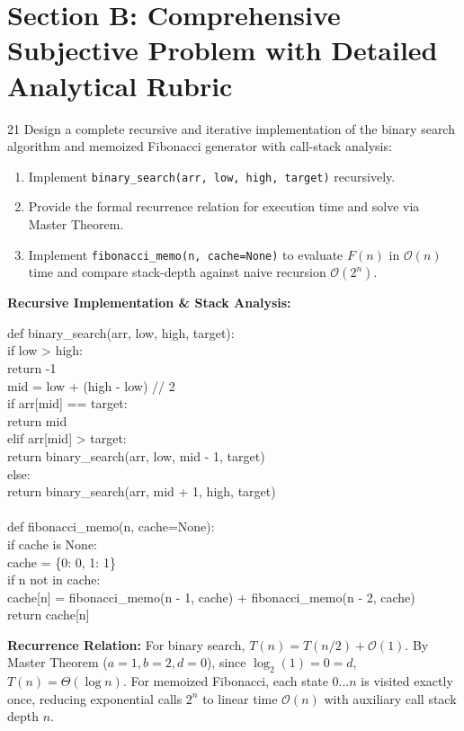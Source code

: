 \newpage
\section{Section B: Comprehensive Subjective Problem with Detailed Analytical Rubric}

\begin{subjectiveq}{2}{1}
Design a complete recursive and iterative implementation of the binary search algorithm and memoized Fibonacci generator with call-stack analysis:
\begin{enumerate}[label=(\alph*)]
    \item Implement \texttt{binary\_search(arr, low, high, target)} recursively.
    \item Provide the formal recurrence relation for execution time and solve via Master Theorem.
    \item Implement \texttt{fibonacci\_memo(n, cache=None)} to evaluate $F(n)$ in $\mathcal{O}(n)$ time and compare stack-depth against naive recursion $\mathcal{O}(2^n)$.
\end{enumerate}
\end{subjectiveq}

\begin{solbox}
\textbf{Recursive Implementation \& Stack Analysis:}
\begin{pycode}
def binary\_search(arr, low, high, target):\\
\quad if low > high:\\
\quad \quad return -1\\
\quad mid = low + (high - low) // 2\\
\quad if arr[mid] == target:\\
\quad \quad return mid\\
\quad elif arr[mid] > target:\\
\quad \quad return binary\_search(arr, low, mid - 1, target)\\
\quad else:\\
\quad \quad return binary\_search(arr, mid + 1, high, target)\\
~\\
def fibonacci\_memo(n, cache=None):\\
\quad if cache is None:\\
\quad \quad cache = \{0: 0, 1: 1\}\\
\quad if n not in cache:\\
\quad \quad cache[n] = fibonacci\_memo(n - 1, cache) + fibonacci\_memo(n - 2, cache)\\
\quad return cache[n]
\end{pycode}
\textbf{Recurrence Relation:} For binary search, $T(n) = T(n/2) + \mathcal{O}(1)$. By Master Theorem ($a=1, b=2, d=0$), since $\log_2(1) = 0 = d$, $T(n) = \Theta(\log n)$. For memoized Fibonacci, each state $0 \dots n$ is visited exactly once, reducing exponential calls $2^n$ to linear time $\mathcal{O}(n)$ with auxiliary call stack depth $n$.
\end{solbox}

